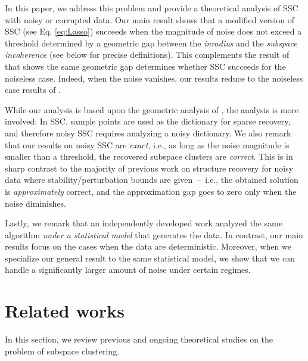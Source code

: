 \documentclass{ctexart}
\begin{document}
In this paper, we address this problem and provide a theoretical analysis of SSC with noisy or corrupted data. Our main result shows that a modified version of SSC (see Eq. \eqref{eq:Lasso}) succeeds when the magnitude of noise does not exceed a threshold determined by a geometric gap between the \emph{inradius} and the \emph{subspace incoherence} (see below for precise definitions). This complements the result of \cite{soltanolkotabi2011geometric} that shows the same geometric gap determines whether SSC succeeds for the noiseless case. Indeed,  when the noise vanishes, our results reduce to the noiseless case results of \cite{soltanolkotabi2011geometric}.

While our analysis is based upon the geometric analysis of \cite{soltanolkotabi2011geometric}, the analysis is more involved: In SSC, sample points are used as the dictionary for sparse recovery, and therefore noisy SSC requires analyzing a noisy dictionary.
We also remark that our results on noisy SSC are {\em exact}, i.e., as long as the noise magnitude is smaller than a threshold, the recovered subspace clusters are {\em correct}.
This is in sharp contrast to the majority of previous work on structure recovery for noisy data where stability/perturbation bounds are given~--~i.e., the obtained solution is {\em approximately} correct, and the approximation gap goes to zero only when the noise diminishes.

Lastly, we remark that an independently developed work \cite{soltanolkotabi2013robust} analyzed the same algorithm {\em under a statistical model} that generates the data. In contrast, our main results focus on the cases when the data are deterministic. Moreover, when we specialize our general result to the same statistical model, we show that we can handle a significantly larger amount of noise under certain regimes.




\section{Related works}\label{sec:RelatedWorks}
In this section, we review  previous and ongoing theoretical studies on the problem of subspace clustering.
\end{document}
